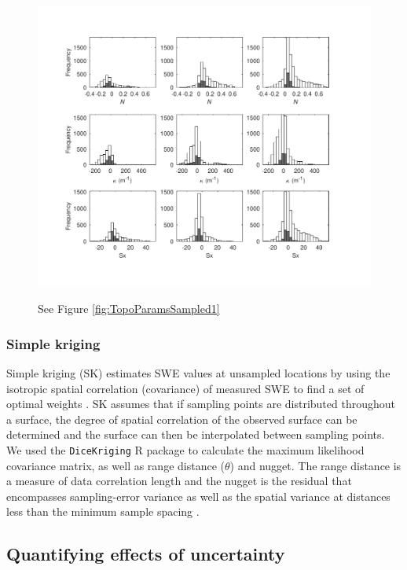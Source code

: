 \documentclass[review,oneside, letterpaper]{igs}
\begin{document}
\begin{figure}
	\centering
	\includegraphics[width =\textwidth]{TopoParamsSampled2.pdf}\\
	\caption{See Figure \ref{fig:TopoParamsSampled1}}
	\label{fig:TopoParamsSampled2}
\end{figure}

\subsubsection{Simple kriging}

Simple kriging (SK) estimates SWE values at unsampled locations by using the isotropic spatial correlation (covariance) of measured SWE to find a set of optimal weights \citep{Davis1986, Li2008}. SK assumes that if sampling points are distributed throughout a surface, the degree of spatial correlation of the observed surface can be determined and the surface can then be interpolated between sampling points. We used the \texttt{DiceKriging} R package \citep{Roustant2012} to calculate the maximum likelihood covariance matrix, as well as range distance ($\theta$) and nugget. The range distance is a measure of data correlation length and the nugget is the residual that encompasses sampling-error variance as well as the spatial variance at distances less than the minimum sample spacing \citep{Li2008}. 

\subsection{Quantifying effects of uncertainty}
\end{document}
